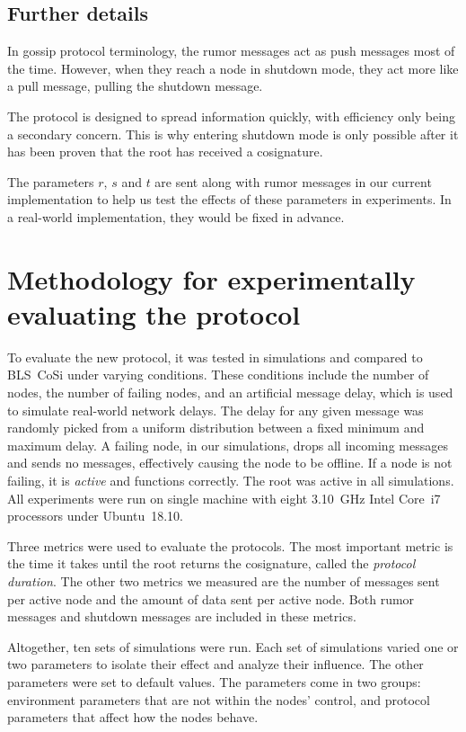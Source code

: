 \subsection{Further details}

In gossip protocol terminology, the rumor messages act as push messages most of the time.
However, when they reach a node in shutdown mode, they act more like a pull message, pulling the shutdown message.

The protocol is designed to spread information quickly, with efficiency only being a secondary concern.
This is why entering shutdown mode is only possible after it has been proven that the root has received a cosignature.

The parameters $r$, $s$ and $t$ are sent along with rumor messages in our current implementation to help us test the effects of these parameters in experiments.
In a real-world implementation, they would be fixed in advance.


\section{Methodology for experimentally evaluating the protocol}
\label{methodology}

To evaluate the new protocol, it was tested in simulations and compared to BLS~CoSi under varying conditions.
These conditions include the number of nodes, the number of failing nodes, and an artificial message delay, which is used to simulate real-world network delays.
The delay for any given message was randomly picked from a uniform distribution between a fixed minimum and maximum delay.
A failing node, in our simulations, drops all incoming messages and sends no messages, effectively causing the node to be offline.
If a node is not failing, it is \emph{active} and functions correctly.
The root was active in all simulations.
All experiments were run on single machine with eight 3.10~GHz Intel Core~i7 processors under Ubuntu~18.10.

Three metrics were used to evaluate the protocols.
The most important metric is the time it takes until the root returns the cosignature, called the \emph{protocol duration}.
The other two metrics we measured are the number of messages sent per active node and the amount of data sent per active node.
Both rumor messages and shutdown messages are included in these metrics.

Altogether, ten sets of simulations were run.
Each set of simulations varied one or two parameters to isolate their effect and analyze their influence.
The other parameters were set to default values.
The parameters come in two groups: environment parameters that are not within the nodes' control, and protocol parameters that affect how the nodes behave.

